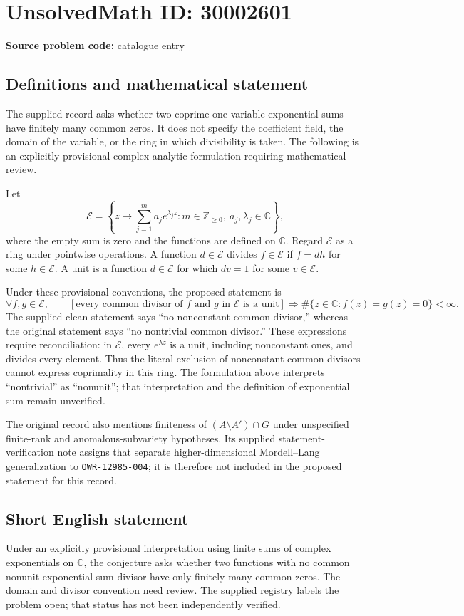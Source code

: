 \documentclass[11pt]{article}
\newcommand{\Z}{\mathbb{Z}}
\newcommand{\C}{\mathbb{C}}
\begin{document}
\section*{UnsolvedMath ID: 30002601}
\textbf{Source problem code:} catalogue entry
\subsection{Definitions and mathematical statement}
The supplied record asks whether two coprime one-variable exponential sums have finitely many common zeros. It does not specify the coefficient field, the domain of the variable, or the ring in which divisibility is taken. The following is an explicitly provisional complex-analytic formulation requiring mathematical review.

Let
\[
\mathcal E=\left\{z\longmapsto\sum_{j=1}^{m}a_j e^{\lambda_j z}:m\in\Z_{\geq 0},\ a_j,\lambda_j\in\C\right\},
\]
where the empty sum is zero and the functions are defined on \(\C\). Regard \(\mathcal E\) as a ring under pointwise operations. A function \(d\in\mathcal E\) divides \(f\in\mathcal E\) if \(f=dh\) for some \(h\in\mathcal E\). A unit is a function \(d\in\mathcal E\) for which \(dv=1\) for some \(v\in\mathcal E\).

Under these provisional conventions, the proposed statement is
\[
\forall f,g\in\mathcal E,\qquad
\left[\text{every common divisor of }f\text{ and }g\text{ in }\mathcal E\text{ is a unit}\right]
\Longrightarrow
\#\{z\in\C:f(z)=g(z)=0\}<\infty.
\]
The supplied clean statement says ``no nonconstant common divisor,'' whereas the original statement says ``no nontrivial common divisor.'' These expressions require reconciliation: in \(\mathcal E\), every \(e^{\lambda z}\) is a unit, including nonconstant ones, and divides every element. Thus the literal exclusion of nonconstant common divisors cannot express coprimality in this ring. The formulation above interprets ``nontrivial'' as ``nonunit''; that interpretation and the definition of exponential sum remain unverified.

The original record also mentions finiteness of \((A\setminus A')\cap G\) under unspecified finite-rank and anomalous-subvariety hypotheses. Its supplied statement-verification note assigns that separate higher-dimensional Mordell--Lang generalization to \texttt{OWR-12985-004}; it is therefore not included in the proposed statement for this record.
\subsection{Short English statement}
Under an explicitly provisional interpretation using finite sums of complex exponentials on \(\C\), the conjecture asks whether two functions with no common nonunit exponential-sum divisor have only finitely many common zeros. The domain and divisor convention need review. The supplied registry labels the problem open; that status has not been independently verified.
\end{document}
